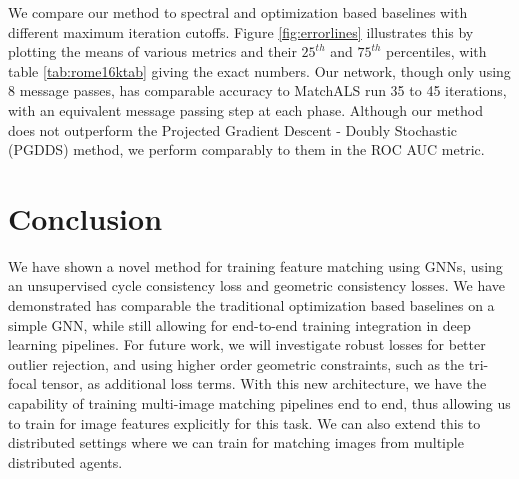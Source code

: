 \documentclass{article} %
\begin{document}
We compare our method to spectral and optimization based baselines with different maximum iteration cutoffs.
Figure \ref{fig:errorlines} illustrates this by plotting the means of various metrics and their $25^{th}$ and $75^{th}$ percentiles, with table \ref{tab:rome16ktab} giving the exact numbers.
Our network, though only using 8 message passes, has comparable accuracy to MatchALS \cite{zhou2015multi} run 35 to 45 iterations, with an equivalent message passing step at each phase.
Although our method does not outperform the Projected Gradient Descent - Doubly Stochastic (PGDDS) \cite{leonardos2016distributed} method, we perform comparably to them in the ROC AUC metric.

\section{Conclusion}

We have shown a novel method for training feature matching using GNNs, using an unsupervised cycle consistency loss and geometric consistency losses.
We have demonstrated has comparable the traditional optimization based baselines on a simple GNN, while still allowing for end-to-end training integration in deep learning pipelines.
For future work, we will investigate robust losses for better outlier rejection, and using higher order geometric constraints, such as the tri-focal tensor, as additional loss terms.
With this new architecture, we have the capability of training multi-image matching pipelines end to end, thus allowing us to train for image features explicitly for this task.
We can also extend this to distributed settings where we can train for matching images from multiple distributed agents. 
\end{document}
